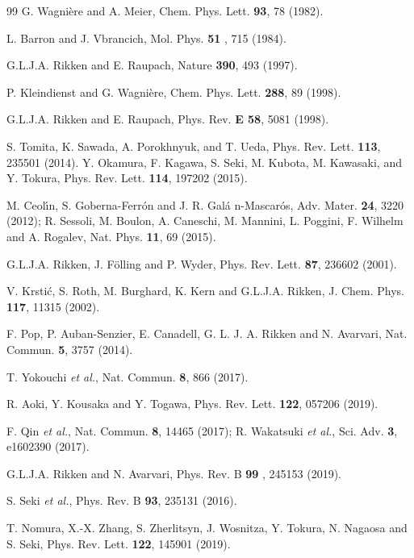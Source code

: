 \documentclass[prl,twocolumn]{revtex4-2}
\begin{document}
\begin{thebibliography}{99}
 G. Wagni\`{e}re and A. Meier, Chem. Phys. Lett.
\textbf{93}, 78 (1982).

 L. Barron and J. Vbrancich, Mol. Phys. \textbf{51}
, 715 (1984).

 G.L.J.A. Rikken and E. Raupach, Nature \textbf{390}, 493
(1997).

 P. Kleindienst and G. Wagni\`{e}re, Chem. Phys. Lett.
\textbf{288}, 89 (1998).

 G.L.J.A. Rikken and E. Raupach, Phys. Rev. \textbf{E 58},
5081 (1998).

 S. Tomita, K. Sawada, A. Porokhnyuk, and T. Ueda,
Phys. Rev. Lett. \textbf{113}, 235501 (2014). Y. Okamura, F. Kagawa, S.
Seki, M. Kubota, M. Kawasaki, and Y. Tokura, Phys. Rev. Lett. \textbf{114},
197202 (2015).

 M. Ceol\'{\i}n, S. Goberna-Ferr\'{o}n and J. R. Gal\'{a}
n-Mascar\'{o}s, Adv. Mater. \textbf{24}, 3220 (2012); R. Sessoli, M. Boulon,
A. Caneschi, M. Mannini, L. Poggini, F. Wilhelm and A. Rogalev, Nat. Phys.
\textbf{11}, 69 (2015).

 G.L.J.A. Rikken, J. F\"{o}lling and P. Wyder, Phys. Rev.
Lett. \textbf{87}, 236602 (2001).

 V. Krsti\'{c}, S. Roth, M. Burghard, K. Kern and G.L.J.A.
Rikken, J. Chem. Phys. \textbf{117}, 11315 (2002).

 F. Pop, P. Auban-Senzier, E. Canadell, G. L. J. A. Rikken and
N. Avarvari, Nat. Commun. \textbf{5}, 3757 (2014).

 T. Yokouchi \textit{et al.}, Nat. Commun. \textbf{8}, 866
(2017).

 R. Aoki, Y. Kousaka and Y. Togawa, Phys. Rev. Lett. \textbf{
122}, 057206 (2019).

 F. Qin \textit{et al.}, Nat. Commun. \textbf{8},
14465 (2017); R. Wakatsuki \textit{et al.}, Sci. Adv. \textbf{3}, e1602390
(2017).

 G.L.J.A. Rikken and N. Avarvari, Phys. Rev. B \textbf{99}
, 245153 (2019).

 S. Seki \textit{et al.}, Phys. Rev. B \textbf{93},
235131 (2016).

 T. Nomura, X.-X. Zhang, S. Zherlitsyn, J. Wosnitza, Y.
Tokura, N. Nagaosa and S. Seki, Phys. Rev. Lett. \textbf{122}, 145901 (2019).


\end{thebibliography}
\end{document}
